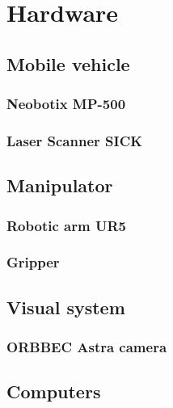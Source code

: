 \chapter{Hardware}

\section{Mobile vehicle}

\subsection{Neobotix MP-500}
\subsection{Laser Scanner SICK}

\section{Manipulator}

\subsection{Robotic arm UR5}
\subsection{Gripper}

\section{Visual system}

\subsection{ORBBEC Astra camera}

\section{Computers}

